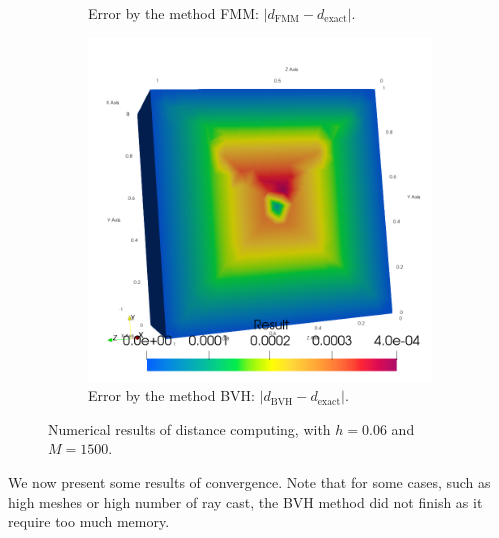\begin{figure}
\begin{subfigure}{0.33\textwidth}
        \caption{Error by the method FMM: $|d_\mathrm{FMM}-d_\mathrm{exact}|$.}
        \label{fig:specs:app-feelpp-distance:results:error-fmm}
    \end{subfigure}
    \begin{subfigure}{0.33\textwidth}
        \centering
        \includegraphics[width=\columnwidth]{graphics/feelpp/feelpp-benchmark-distance-errorBVH}
        \caption{Error by the method BVH: $|d_\mathrm{BVH}-d_\mathrm{exact}|$.}
        \label{fig:specs:app-feelpp-distance:results:error-bvh}
    \end{subfigure}
    \caption{Numerical results of distance computing, with $h=0.06$ and $M=1500$.}
    \label{fig:specs:app-feelpp-distance:results}
\end{figure}

We now present some results of convergence.
Note that for some cases, such as high meshes or high number of ray cast, the BVH method did not finish as it require too much memory.


\dataTimeBVHnp
{}\dataSpeedupBVHnp
{}\dataTimeFMMnp
{}\dataTimeBVHM
{}\dataConvBVH
{}\dataConvFMM


